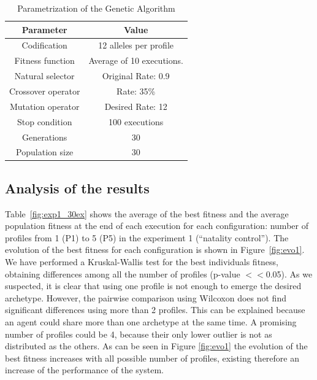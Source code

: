 \documentclass{sig-alternate}
\begin{document}
\begin{table}
\begin{center}
\caption{Parametrization of the Genetic Algorithm}
\label{fig:ga_parameters}
\begin{tabular}{cc}%
\hline\noalign{\smallskip}
\noalign{\smallskip}
Parameter & Value \\
\hline
\noalign{\smallskip}
Codification & 12 alleles per profile\\
Fitness function & Average of 10 executions.\\
Natural selector & Original Rate: 0.9 \\
Crossover operator & Rate: 35\% \\
Mutation operator & Desired Rate: 12 \\
Stop condition & 100 executions\\
Generations & 30\\
Population size & 30 \\
\hline
\end{tabular}


\end{center}
\end{table}

\subsection{Analysis of the results}





Table~\ref{fig:exp1_30ex} shows the average of the best fitness and the average population fitness at the end of each execution for each configuration: number of profiles from 1 (P1) to 5 (P5) in the experiment 1 (``natality control'').
The evolution of the best fitness for each configuration is shown in Figure~\ref{fig:evo1}. We have performed a Kruskal-Wallis test for the best individuals fitness, obtaining differences among all the number of profiles (p-value $<<$0.05). As we suspected, it is clear that using one profile is not enough to emerge the desired archetype. However, the pairwise comparison using Wilcoxon does not find significant differences using more than 2 profiles. This can be explained because an agent could share more than one archetype at the same time.  A promising number of profiles could be 4, because their only lower outlier is not as distributed as the others. As can be seen in Figure \ref{fig:evo1} the evolution of the best fitness increases with all possible number of profiles, existing therefore an increase of the performance of the system.
\end{document}
